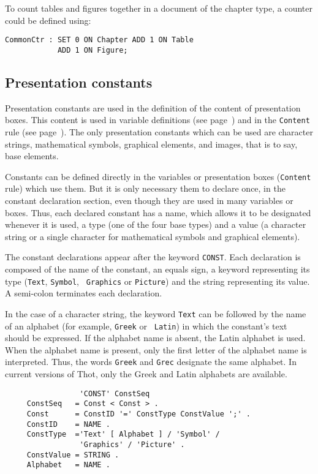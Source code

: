 \begin{example}
To count tables and figures together in a document of the chapter
type, a counter could be defined using:
\begin{verbatim}
CommonCtr : SET 0 ON Chapter ADD 1 ON Table
            ADD 1 ON Figure;
\end{verbatim}
\end{example}

\subsection{Presentation constants}
\label{constpres}

Presentation constants are used in the definition of the content of
presentation boxes.  This content is used in variable definitions (see
page~\pageref{variables}) and in the {\tt Content} rule (see
page~\pageref{content}).  The only presentation constants which can be
used are character strings, mathematical symbols, graphical elements,
and images, that is to say, base elements.

Constants can be defined directly in the variables or presentation
boxes ({\tt Content} rule) which use them.  But it is only necessary them
to declare once, in the constant declaration section, even though they
are used in many variables or boxes.  Thus, each declared constant has
a name, which allows it to be designated whenever it is used, a type
(one of the four base types) and a value (a character string or a
single character for mathematical symbols and graphical elements).

The constant declarations appear after the keyword {\tt CONST}.  Each
declaration is composed of the name of the constant, an equals sign, a
keyword representing its type ({\tt Text}, {\tt Symbol}, {\tt
Graphics} or {\tt Picture}) and the string representing its value.
A semi-colon terminates each declaration.

In the case of a character string, the keyword {\tt Text} can be
followed by the name of an alphabet (for example, {\tt Greek} or {\tt
Latin}) in which the constant's text should be expressed.  If the
alphabet name is absent, the Latin alphabet is used.  When the
alphabet name is present, only the first letter of the alphabet name
is interpreted.  Thus, the words {\tt Greek} and {\tt Grec} designate
the same alphabet.  In current versions of Thot, only the Greek and
Latin alphabets are available.

\begin{verbatim}
                 'CONST' ConstSeq
     ConstSeq   = Const < Const > .
     Const      = ConstID '=' ConstType ConstValue ';' .
     ConstID    = NAME .
     ConstType  ='Text' [ Alphabet ] / 'Symbol' /
                 'Graphics' / 'Picture' .
     ConstValue = STRING .
     Alphabet   = NAME .
\end{verbatim}

